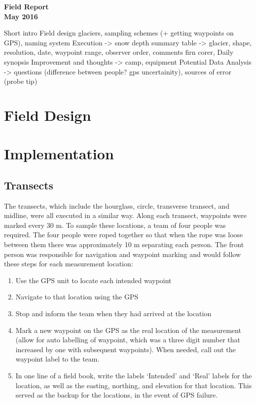 \documentclass[12pt]{article}
\begin{document}

\begin{center}
\Large \textbf{Field Report \\ May 2016}
\end{center}

Short intro
Field design 
	glaciers,
	sampling schemes (+ getting waypoints on GPS), naming system
Execution -> 
		snow depth summary table -> glacier, shape, resolution, date, waypoint range, observer order, comments
	firn corer, 
Daily synopsis
Improvement and thoughts -> camp, equipment
Potential Data Analysis -> questions (difference between people? gps uncertainity), sources of error (probe tip)


\section{Field Design}


\section{Implementation}

\subsection{Transects}
\label{sec:transects}

The transects, which include the hourglass, circle, transverse transect, and midline, were all executed in a similar way. Along each transect, waypoints were marked every 30 m. To sample these locations, a team of four people was required. The four people were roped together so that when the rope was loose between them there was approximately 10 m separating each person. The front person was responsible for navigation and waypoint marking and would follow these steps for each measurement location:
\begin{enumerate}
\item Use the GPS unit to locate each intended waypoint
\item Navigate to that location using the GPS
\item Stop and inform the team when they had arrived at the location
\item Mark a new waypoint on the GPS as the real location of the measurement (allow for auto labelling of waypoint, which was a three digit number that increased by one with subsequent waypoints). When needed, call out the waypoint label to the team.
\item In one line of a field book, write the labels `Intended' and `Real' labels for the location, as well as the easting, northing, and elevation for that location. This served as the backup for the locations, in the event of GPS failure. 
\end{enumerate}
\end{document}
